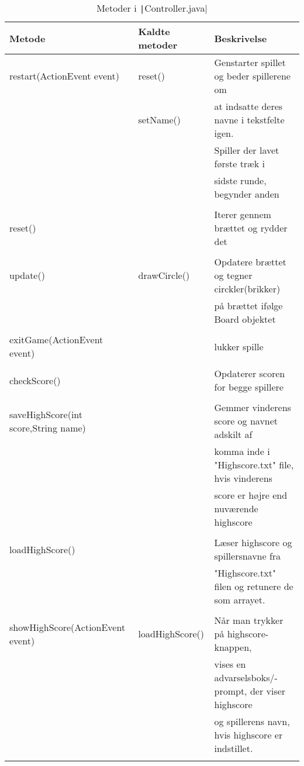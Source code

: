 \begin{table}[H]
\centering
\caption{Metoder i \texttt|Controller.java|}\label{tbl:2}

\begin{tabular}{lll}
\toprule
Metode & Kaldte metoder & Beskrivelse  \\
\midrule
restart(ActionEvent event) & reset() & Genstarter spillet og beder spillerene om   \\
& setName() & at indsatte deres navne  i tekstfelte igen.  \\
& & Spiller der lavet første træk i  \\
& & sidste runde, begynder anden \\
\\
reset() & & Iterer gennem brættet og rydder det \\
\\
update() & drawCircle() & Opdatere brættet og tegner circkler(brikker)  \\
& & på brættet ifølge Board objektet \\
\\
exitGame(ActionEvent event) & & lukker spille\\
\\
checkScore()& & Opdaterer scoren for begge spillere\\
\\

saveHighScore(int score,String name) & & Gemmer vinderens score og navnet adskilt af \\
& &  komma inde i "Highscore.txt" file, hvis vinderens  \\
& & score er højre end nuværende highscore\\
\\
loadHighScore() & & Læser highscore og spillersnavne fra \\
& & "Highscore.txt" filen og retunere de som arrayet.\\
\\
showHighScore(ActionEvent event) & loadHighScore() & Når man trykker på highscore-knappen, \\
& & vises en advarselsboks/-prompt, der viser highscore  \\
& & og spillerens navn, hvis highscore er indstillet. \\
\\


\end{tabular}
\end{table}
